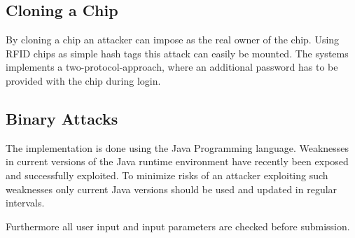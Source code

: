 \documentclass[12pt,a4paper,titlepage,oneside]{scrartcl}
\begin{document}
\subsection{Cloning a Chip}
By cloning a chip an attacker can impose as the real owner of the chip. Using RFID chips as simple hash tags this attack can easily be mounted. The systems implements a two-protocol-approach, where an additional password has to be provided with the chip during login.

\subsection{Binary Attacks}
The implementation is done using the Java Programming language. Weaknesses in current versions of the Java runtime environment have recently been exposed and successfully exploited. To minimize risks of an attacker exploiting such weaknesses only current Java versions should be used and updated in regular intervals.

Furthermore all user input and input parameters are checked before submission.


%
%
\end{document}
